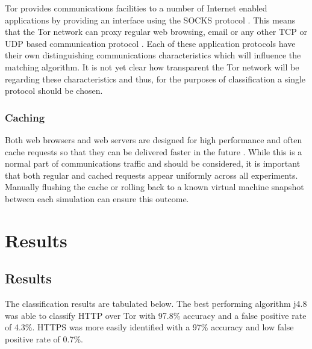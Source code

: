 \documentclass{ecuthesis}
\begin{document}
Tor provides communications facilities to a number of Internet enabled
applications by providing an interface using the SOCKS protocol
\parencite[17]{Dingledine:2004p314}. This means that the Tor network can proxy
regular web browsing, email or any other TCP or UDP based communication protocol
\parencite{website:socks}. Each of these application protocols have their own
distinguishing communications characteristics which will influence the matching
algorithm. It is not yet clear how transparent the Tor network will be regarding
these characteristics and thus, for the purposes of classification a single
protocol should be chosen.

\subsection{Caching}

Both web browsers and web servers are designed for high performance and often
cache requests so that they can be delivered faster in the future
\parencite{Caceres:1998p7419}. While this is a normal part of communications
traffic and should be considered, it is important that both regular and cached
requests appear uniformly across all experiments. Manually flushing the cache
or rolling back to a known virtual machine snapshot between each simulation can
ensure this outcome.



\chapter{Results}

\section{Results}

The classification results are tabulated below. The best performing algorithm
j4.8 was able to classify HTTP over Tor with 97.8\% accuracy and a false
positive rate of 4.3\%. HTTPS was more easily identified with a 97\% accuracy
and low false positive rate of 0.7\%.
\end{document}
